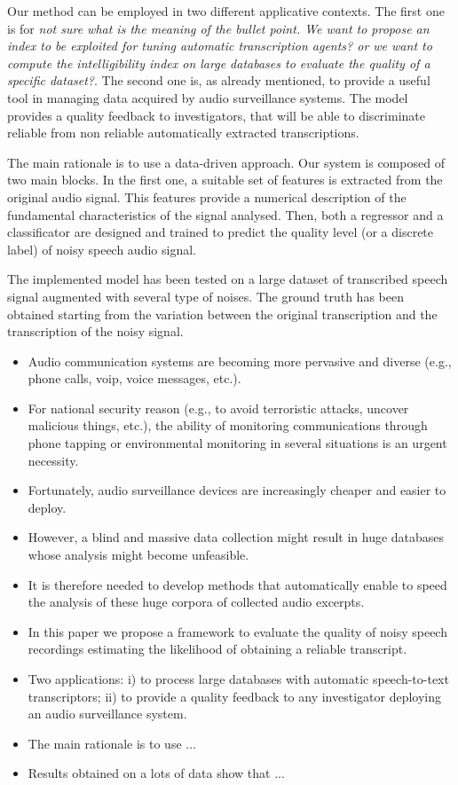 Our method can be employed in two different applicative contexts. The first one is for \textit{not sure what is the meaning of the bullet point. We want to propose an index to be exploited for tuning automatic transcription agents? or we want to compute the intelligibility index on large databases to evaluate the quality of a specific dataset?}.
The second one is, as already mentioned, to provide a useful tool in managing data acquired by audio surveillance systems. The model provides a quality feedback to investigators, that will be able to discriminate reliable from non reliable automatically extracted transcriptions.
 

The main rationale is to use a data-driven approach. Our system is composed of two main blocks. In the first one, a suitable set of features is extracted from the original audio signal. This features provide a numerical description of the fundamental characteristics of the signal analysed. Then, both a regressor and a classificator are designed and trained to predict the quality level (or a discrete label) of noisy speech audio signal. 


The implemented model has been tested on a large dataset of transcribed speech signal augmented with several type of noises. The ground truth has been obtained starting from the variation between the original transcription and the transcription of the noisy signal.

\begin{itemize}


	\item Audio communication systems are becoming more pervasive and diverse (e.g., phone calls, voip, voice messages, etc.).
	
	\item For national security reason (e.g., to avoid terroristic attacks, uncover malicious things, etc.), the ability of monitoring communications through phone tapping or environmental monitoring in several situations is an urgent necessity.
	
	\item Fortunately, audio surveillance devices are increasingly cheaper and easier to deploy.
	\item However, a blind and massive data collection might result in huge databases whose analysis might become unfeasible.
	\item It is therefore needed to develop methods that automatically enable to speed the analysis of these huge corpora of collected audio excerpts.
	\item In this paper we propose a framework to evaluate the quality of noisy speech recordings estimating the likelihood of obtaining a reliable transcript.
	\item Two applications: i) to process large databases with automatic speech-to-text transcriptors; ii) to provide a quality feedback to any investigator deploying an audio surveillance system.
	\item The main rationale is to use ...
	\item Results obtained on a lots of data show that ...
\end{itemize}


\cite{Piva2013}
